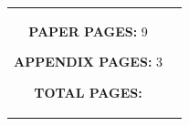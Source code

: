 \begin{titlepage}
\begin{nopagebreak}
{\begin{tabular}{cc}
{\begin{description}
        \item {\bf PAPER PAGES:} 9
        \item {\bf APPENDIX PAGES:} 3
        \item {\bf TOTAL PAGES:} \pageref{LastPage}
\end{description}

\vfill } &
\parbox{7cm}{
  \vspace{.15cm}
  \flushright
}
\end{tabular}
}

\end{nopagebreak}
\end{titlepage}